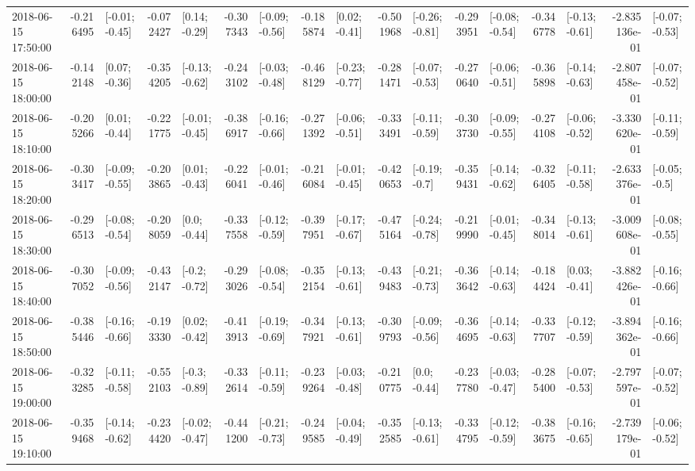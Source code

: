 \begin{tabular}{lrlrlrlrlrlrlrlrl}
2018-06-15 17:50:00 & -0.216495 &  [-0.01; -0.45] & -0.072427 &   [0.14; -0.29] & -0.307343 &  [-0.09; -0.56] & -0.185874 &   [0.02; -0.41] & -0.501968 &  [-0.26; -0.81] & -0.293951 &  [-0.08; -0.54] & -0.346778 &  [-0.13; -0.61] & -2.835136e-01 &  [-0.07; -0.53] \\
2018-06-15 18:00:00 & -0.142148 &   [0.07; -0.36] & -0.354205 &  [-0.13; -0.62] & -0.243102 &  [-0.03; -0.48] & -0.468129 &  [-0.23; -0.77] & -0.281471 &  [-0.07; -0.53] & -0.270640 &  [-0.06; -0.51] & -0.365898 &  [-0.14; -0.63] & -2.807458e-01 &  [-0.07; -0.52] \\
2018-06-15 18:10:00 & -0.205266 &   [0.01; -0.44] & -0.221775 &  [-0.01; -0.45] & -0.386917 &  [-0.16; -0.66] & -0.271392 &  [-0.06; -0.51] & -0.333491 &  [-0.11; -0.59] & -0.303730 &  [-0.09; -0.55] & -0.274108 &  [-0.06; -0.52] & -3.330620e-01 &  [-0.11; -0.59] \\
2018-06-15 18:20:00 & -0.303417 &  [-0.09; -0.55] & -0.203865 &   [0.01; -0.43] & -0.226041 &  [-0.01; -0.46] & -0.216084 &  [-0.01; -0.45] & -0.420653 &   [-0.19; -0.7] & -0.359431 &  [-0.14; -0.62] & -0.326405 &  [-0.11; -0.58] & -2.633376e-01 &   [-0.05; -0.5] \\
2018-06-15 18:30:00 & -0.296513 &  [-0.08; -0.54] & -0.208059 &    [0.0; -0.44] & -0.337558 &  [-0.12; -0.59] & -0.397951 &  [-0.17; -0.67] & -0.475164 &  [-0.24; -0.78] & -0.219990 &  [-0.01; -0.45] & -0.348014 &  [-0.13; -0.61] & -3.009608e-01 &  [-0.08; -0.55] \\
2018-06-15 18:40:00 & -0.307052 &  [-0.09; -0.56] & -0.432147 &   [-0.2; -0.72] & -0.293026 &  [-0.08; -0.54] & -0.352154 &  [-0.13; -0.61] & -0.439483 &  [-0.21; -0.73] & -0.363642 &  [-0.14; -0.63] & -0.184424 &   [0.03; -0.41] & -3.882426e-01 &  [-0.16; -0.66] \\
2018-06-15 18:50:00 & -0.385446 &  [-0.16; -0.66] & -0.193330 &   [0.02; -0.42] & -0.413913 &  [-0.19; -0.69] & -0.347921 &  [-0.13; -0.61] & -0.309793 &  [-0.09; -0.56] & -0.364695 &  [-0.14; -0.63] & -0.337707 &  [-0.12; -0.59] & -3.894362e-01 &  [-0.16; -0.66] \\
2018-06-15 19:00:00 & -0.323285 &  [-0.11; -0.58] & -0.552103 &   [-0.3; -0.89] & -0.332614 &  [-0.11; -0.59] & -0.239264 &  [-0.03; -0.48] & -0.210775 &    [0.0; -0.44] & -0.237780 &  [-0.03; -0.47] & -0.285400 &  [-0.07; -0.53] & -2.797597e-01 &  [-0.07; -0.52] \\
2018-06-15 19:10:00 & -0.359468 &  [-0.14; -0.62] & -0.234420 &  [-0.02; -0.47] & -0.441200 &  [-0.21; -0.73] & -0.249585 &  [-0.04; -0.49] & -0.352585 &  [-0.13; -0.61] & -0.334795 &  [-0.12; -0.59] & -0.383675 &  [-0.16; -0.65] & -2.739179e-01 &  [-0.06; -0.52] \\

\end{tabular}
